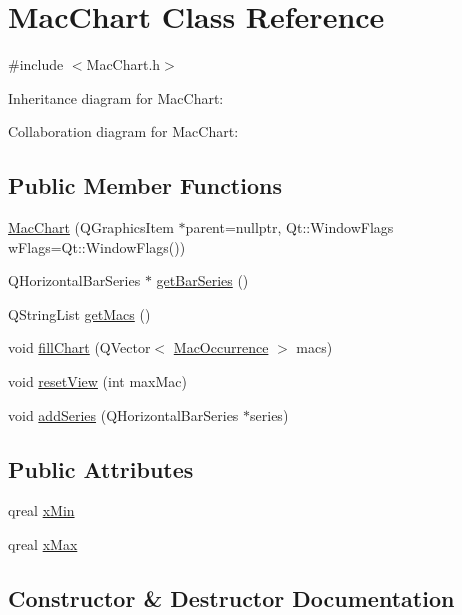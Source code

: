 \hypertarget{class_mac_chart}{}\section{Mac\+Chart Class Reference}
\label{class_mac_chart}


{\ttfamily \#include $<$Mac\+Chart.\+h$>$}



Inheritance diagram for Mac\+Chart\+:


Collaboration diagram for Mac\+Chart\+:
\subsection*{Public Member Functions}
\begin{DoxyCompactItemize}
\item 
\hyperlink{class_mac_chart_a45705f9c1f051464bb1b9bcc64b324a3}{Mac\+Chart} (Q\+Graphics\+Item $\ast$parent=nullptr, Qt\+::\+Window\+Flags w\+Flags=Qt\+::\+Window\+Flags())
\item 
Q\+Horizontal\+Bar\+Series $\ast$ \hyperlink{class_mac_chart_a7fed27808adb5d9372b934d848c287cf}{get\+Bar\+Series} ()
\item 
Q\+String\+List \hyperlink{class_mac_chart_aa43f71c446eb28ba714db92284fffea9}{get\+Macs} ()
\item 
void \hyperlink{class_mac_chart_aefd498e08bca6b605022d68f04e76666}{fill\+Chart} (Q\+Vector$<$ \hyperlink{class_mac_occurrence}{Mac\+Occurrence} $>$ macs)
\item 
void \hyperlink{class_mac_chart_a596828ccb8442002e14101c75803eb78}{reset\+View} (int max\+Mac)
\item 
void \hyperlink{class_mac_chart_aef583e4cf5c78a34c43c9f86a08eefee}{add\+Series} (Q\+Horizontal\+Bar\+Series $\ast$series)
\end{DoxyCompactItemize}
\subsection*{Public Attributes}
\begin{DoxyCompactItemize}
\item 
qreal \hyperlink{class_mac_chart_a3d658d8028a6963859bf204ccb738826}{x\+Min}
\item 
qreal \hyperlink{class_mac_chart_ad583b1039abca5c77319b584c920f422}{x\+Max}
\end{DoxyCompactItemize}


\subsection{Constructor \& Destructor Documentation}
\mbox{\label{class_mac_chart_a45705f9c1f051464bb1b9bcc64b324a3}} 
